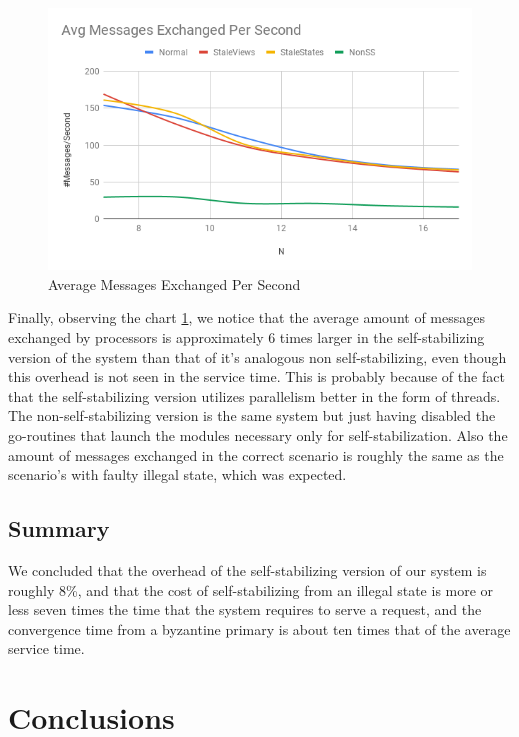\documentclass[12pt,a4paper]{report}
\begin{document}
		\begin{figure}
		    \centering
		    \includegraphics[scale=0.7]{ade/avgexchange.png}
		    \caption{Average Messages Exchanged Per Second}
		    \label{fig:avgmsg}
		\end{figure}
		
		Finally, observing the chart \ref{fig:avgmsg}, we notice that the average amount of messages exchanged by processors is approximately 6 times larger in the self-stabilizing version of the system than that of it's analogous non self-stabilizing, even though this overhead is not seen in the service time. This is probably because of the fact that the self-stabilizing version utilizes parallelism better in the form of threads. The non-self-stabilizing version is the same system but just having disabled the go-routines that launch the modules necessary only for self-stabilization. Also the amount of messages exchanged in the correct scenario is roughly the same as the scenario's with faulty illegal state, which was expected.
	
		\section{Summary}
	 We concluded that the overhead of the self-stabilizing version of our system is roughly 8\%, and that the cost of self-stabilizing from an illegal state is more or less seven times the time that the system requires to serve a request, and the convergence time from a byzantine primary is about ten times that of the average service time.
	\newpage
	\chapter{Conclusions}
\end{document}
